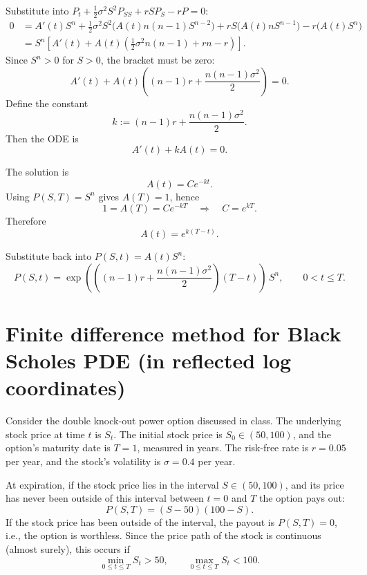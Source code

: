 \documentclass{article}
\begin{document}
Substitute into
\(P_t+\frac12\sigma^2 S^2P_{SS}+rSP_S-rP=0\):
\begin{align*}
0
&=A'(t)S^n
+\frac12\sigma^2 S^2\bigl(A(t)n(n-1)S^{n-2}\bigr)
+rS\bigl(A(t)nS^{n-1}\bigr)
-r\bigl(A(t)S^n\bigr)\\
&=S^n\left[
A'(t)
+A(t)\left(\frac12\sigma^2 n(n-1)+rn-r\right)
\right].
\end{align*}
Since $S^n>0$ for $S>0$, the bracket must be zero:
\[
A'(t)+A(t)\left((n-1)r+\frac{n(n-1)\sigma^2}{2}\right)=0.
\]
Define the constant
\[
k:=(n-1)r+\frac{n(n-1)\sigma^2}{2}.
\]
Then the ODE is
\[
A'(t)+kA(t)=0.
\]


The solution is
\[
A(t)=Ce^{-kt}.
\]
Using $P(S,T)=S^n$ gives $A(T)=1$, hence
\[
1=A(T)=Ce^{-kT}\quad\Longrightarrow\quad C=e^{kT}.
\]
Therefore
\[
A(t)=e^{k(T-t)}.
\]

Substitute back into $P(S,t)=A(t)S^n$:
\[
\boxed{
P(S,t)=\exp\!\left(\left((n-1)r+\frac{n(n-1)\sigma^2}{2}\right)(T-t)\right)\,S^n,
\qquad 0<t\le T.
}
\]


\newpage
\section{Finite difference method for Black Scholes PDE (in reflected log coordinates)}

Consider the double knock-out power option discussed in class. The underlying stock price at time $t$ is $S_t$. The initial stock price is $S_0\in(50,100)$, and the option's maturity date is $T=1$, measured in years. The risk-free rate is $r=0.05$ per year, and the stock's volatility is $\sigma=0.4$ per year.

At expiration, if the stock price lies in the interval $S\in(50,100)$, and its price has never been outside of this interval between $t=0$ and $T$ the option pays out:
\[
P(S,T)=(S-50)(100-S).
\]
If the stock price has been outside of the interval, the payout is $P(S,T)=0$, i.e., the option is worthless. Since the price path of the stock is continuous (almost surely), this occurs if
\[
\min_{0\le t\le T} S_t > 50,
\qquad
\max_{0\le t\le T} S_t < 100.
\]
\end{document}
